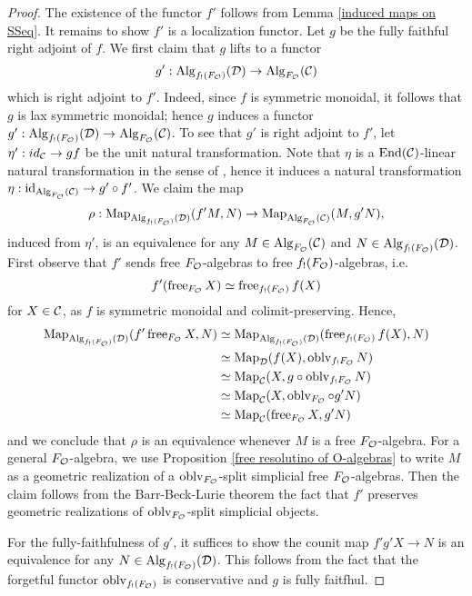 \begin{proof}
	The existence of the functor $f'$ follows from Lemma \ref{induced maps on SSeq}. It remains to show $f'$ is a localization functor. Let $g$ be the fully faithful right adjoint of $f$. We first claim that $g$ lifts to a functor 
	$$
	g': \operatorname{Alg}_{f_{!}(F_{\mathcal{O}})}({\mathcal{D}})
	\to 
	\operatorname{Alg}_{F_{\mathcal{O}}}({\mathcal{C}})
	$$
	which is right adjoint to $f'$. 
	Indeed, since $f$ is symmetric monoidal, it follows that $g$ is lax symmetric monoidal; hence $g$ induces a functor $g': \operatorname{Alg}_{f_{!}(F_{\mathcal{O}})}({\mathcal{D}})
	\to 
	\operatorname{Alg}_{F_{\mathcal{O}}}({\mathcal{C}})$.
	To see that $g'$ is right adjoint to $f'$, let $\eta': id_{{\mathcal{C}}} \to gf$ be the unit natural transformation.
	Note that $\eta$ is a $\operatorname{End}({\mathcal{C}})$-linear natural transformation in the sense of \cite[Definition 4.6.2.7.]{HA}, hence it induces a natural transformation $\eta: \operatorname{id}_{\operatorname{Alg}_{F_{{\mathcal{O}}}}({\mathcal{C}})} \to g'\circ f'$.
	We claim the map
	$$
	\rho:
	\operatorname{Map}_{\operatorname{Alg}_{f_{!}(F_{\mathcal{O}})}({\mathcal{D}})}(f'M, N)
	\to 
	\operatorname{Map}_{\operatorname{Alg}_{F_{\mathcal{O}}}({\mathcal{C}})}(M, g'N),
	$$
	induced from $\eta'$,
	is an equivalence for any $M\in \operatorname{Alg}_{F_{\mathcal{O}}}({\mathcal{C}})$ and $N\in \operatorname{Alg}_{f_{!}(F_{\mathcal{O}})}({\mathcal{D}})$. First observe that $f'$ sends free $F_{\mathcal{O}}$-algebras to free $f_{!}(F_{\mathcal{O}})$-algebras, i.e.
	$$
	f'(\operatorname{free}_{F_{{\mathcal{O}}}} X)\simeq \operatorname{free}_{f_{!}(F_{\mathcal{O}})} f(X)
	$$
	for $X\in {\mathcal{C}}$,
	as $f$ is symmetric monoidal and colimit-preserving. 
	Hence, 
    \begin{align*}
        \operatorname{Map}_{\operatorname{Alg}_{f_{!}(F_{\mathcal{O}})}({\mathcal{D}})}(f'\operatorname{free}_{F_{{\mathcal{O}}}} X, N) & \simeq \operatorname{Map}_{\operatorname{Alg}_{f_{!}(F_{\mathcal{O}})}({\mathcal{D}})}(\operatorname{free}_{f_{!}(F_{\mathcal{O}})} f(X), N)\\
        & \simeq \operatorname{Map}_{{\mathcal{D}}}(f(X), \operatorname{oblv}_{f_{!}F_{{\mathcal{O}}}}N)\\
        & \simeq \operatorname{Map}_{{\mathcal{C}}}(X, g \circ \operatorname{oblv}_{f_{!}F_{{\mathcal{O}}}}N)\\
        & \simeq \operatorname{Map}_{{\mathcal{C}}}(X, \operatorname{oblv}_{F_{{\mathcal{O}}}}\circ g' N)\\
        & \simeq \operatorname{Map}_{{\mathcal{C}}}(\operatorname{free}_{F_{{\mathcal{O}}}}  X, g' N)
    \end{align*}	
    and we conclude that
	$\rho$ is an equivalence whenever $M$ is a free $F_{{\mathcal{O}}}$-algebra. For a general $F_{{\mathcal{O}}}$-algebra, we use Proposition \ref{free resolutino of O-algebras} to write $M$ as a geometric realization of a $\operatorname{oblv}_{F_{{\mathcal{O}}}}$-split simplicial free $F_{{\mathcal{O}}}$-algebras. Then the claim follows from the Barr-Beck-Lurie theorem \cite[Theorem 4.7.3.5.]{HA} the fact that $f'$ preserves geometric realizations of $\operatorname{oblv}_{F_{{\mathcal{O}}}}$-split simplicial objects.
	
    For the fully-faithfulness of $g'$, it suffices to show the counit map 
    $f'g'X \to N$ is an equivalence for any $N\in \operatorname{Alg}_{f_{!}(F_{\mathcal{O}})}({\mathcal{D}})$. This follows from the fact that the forgetful functor $\operatorname{oblv}_{f_{!}(F_{\mathcal{O}})}$ is conservative and $g$ is fully faitfhul.
\end{proof}

